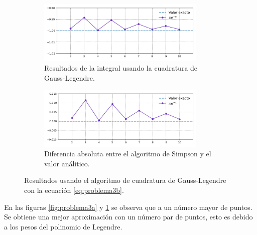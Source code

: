 \begin{enumerate}
          \begin{figure}[H]
              \centering
              \begin{subfigure}[b]{8cm}
                  \includegraphics[width=8cm]{Graphics/problema03_fun_f2.png}
                  \caption{Resultados de la integral usando la cuadratura de Gauss-Legendre.}
              \end{subfigure}
              \begin{subfigure}[b]{8cm}
                  \includegraphics[width=8cm]{Graphics/problema03_diff_f2.png}
                  \caption{Diferencia absoluta entre el algoritmo de Simpson y el valor análitico.}
              \end{subfigure}
              \caption{Resultados usando el algoritmo de cuadratura de Gauss-Legendre con la ecuación \ref{eq:problema3b}.}
              \label{fig:problema3b}
          \end{figure}
\end{enumerate}

En las figuras \ref{fig:problema3a} y \ref{fig:problema3b} se observa que a un número mayor de puntos. Se obtiene una mejor aproximación con un número par de puntos, esto es debido a los pesos del polinomio de Legendre.